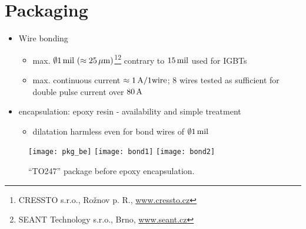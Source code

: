 \section{Packaging} \label{sec:packaging}

\begin{itemize}
    \item Wire bonding 
	\begin{itemize}
	    \item max. $\emptyset 1\, \mathrm{mil} \,\,(\approx 25\, \mathrm{\mu m})$\footnote{CRESSTO s.r.o., Rožnov p. R., \url{www.cressto.cz}}\footnote{SEANT Technology s.r.o., Brno, \url{www.seant.cz}} contrary to $15\, \mathrm{mil}$ used for IGBTs
	    \item max. continuous current $\approx 1\, \mathrm{A/1wire}$; 8 wires tested as sufficient for double pulse current over $80\, \mathrm{A}$
	\end{itemize}
    \item encapsulation: epoxy resin - availability and simple treatment
	\begin{itemize}
	    \item dilatation harmless even for bond wires of $\emptyset 1\, \mathrm{mil}$
	\end{itemize}
\end{itemize}

\begin{figure}[!ht]
    \centering
    \vspace{.3\textheight}
    \texttt{[image: pkg\_be]}
    \texttt{[image: bond1]}
    \texttt{[image: bond2]}
    \caption{``TO247'' package before epoxy encapsulation.}
    \label{fig:pkg_be}
\end{figure}
